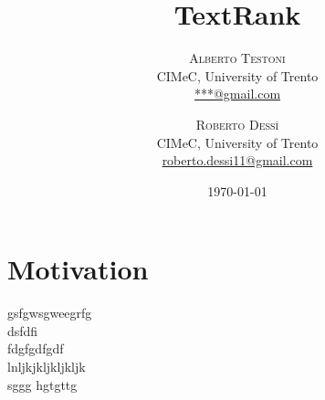 \documentclass[twoside,twocolumn]{article}
\title{TextRank} %
\author{%
	\textsc{Alberto Testoni }\\ [1ex]%
\normalsize CIMeC, University of Trento \\ %
\normalsize \href{mailto:***@gmail.com}{***@gmail.com} %
\and %
\textsc{Roberto Dess\'{i} } \\[1ex] %
\normalsize  CIMeC, University of Trento\\ %
\normalsize \href{mailto:roberto.dessi11@gmail.com}{roberto.dessi11@gmail.com} %
}
\date{\today} %
\begin{document}
\maketitle


\section{Motivation}
gsfgwsgweegrfg   \cite{anatomy} \\
dsfdfi \\
fdgfgdfgdf  \cite{lexrank} \\ 
lnljkjkljkljkljk \cite{pagerank}  \\
\cite{argentina} sggg hgtgttg
\cite{textrank} \cite{rouge}










\end{document}
